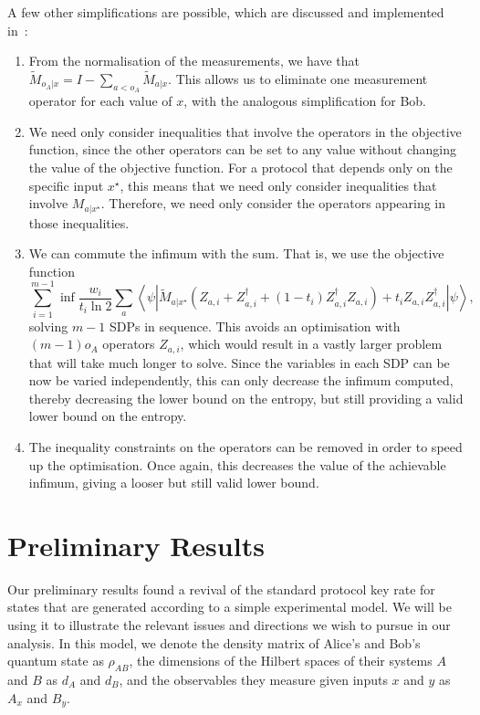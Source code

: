 \documentclass[10pt, a4paper]{article}
\numberwithin{equation}{section} %
\theoremstyle{definition}
\theoremstyle{plain}
\newcommand{\?}{\mathrel{?}} %
\newcommand{\angleb}[1]{\left\langle #1 \right\rangle} %
\begin{document}
      A few other simplifications are possible, which are discussed and implemented in~\cite{BFF_QRE}:
      \begin{enumerate}
        \item From the normalisation of the measurements, we have that \(\tilde{M}_{o_A|x} = I - \sum_{a < o_A} \tilde{M}_{a|x}\). This allows us to eliminate one measurement operator for each value of \(x\), with the analogous simplification for Bob.
        \item We need only consider inequalities that involve the operators in the objective function, since the other operators can be set to any value without changing the value of the objective function. For a protocol that depends only on the specific input \(x^{\star}\), this means that we need only consider inequalities that involve \(M_{a|x^{\star}}\). Therefore, we need only consider the operators appearing in those inequalities.
        \item We can commute the infimum with the sum. That is, we use the objective function
          \begin{equation} 
            \sum_{i=1}^{m-1} \inf \frac{w_i}{t_i \ln 2} \sum_a \angleb{\psi\left|
          \tilde{M}_{a|x^{\star}} \left( Z_{a,i} + Z_{a,i}^{\dagger} + (1-t_i)  Z_{a,i}^{\dagger}Z_{a,i}\right) + t_i Z_{a,i}Z_{a,i}^{\dagger} \right|\psi},
          \end{equation}
          solving \(m-1\) SDPs in sequence. This avoids an optimisation with \((m-1)o_A\) operators \(Z_{a,i}\), which would result in a vastly larger problem that will take much longer to solve. Since the variables in each SDP can be now be varied independently, this can only decrease the infimum computed, thereby decreasing the lower bound on the entropy, but still providing a valid lower bound on the entropy.
        \item The inequality constraints on the operators can be removed in order to speed up the optimisation. Once again, this decreases the value of the achievable infimum, giving a looser but still valid lower bound.
      \end{enumerate}

    \section{Preliminary Results}\label{sec:preres}

    Our preliminary results found a revival of the standard protocol key rate for states that are generated according to a simple experimental model. We will be using it to illustrate the relevant issues and directions we wish to pursue in our analysis. In this model, we denote the density matrix of Alice's and Bob's quantum state as \(\rho_{AB}\), the dimensions of the Hilbert spaces of their systems \(A\) and \(B\) as \(d_A\) and \(d_B\), and the observables they measure given inputs \(x\) and \(y\) as \(A_x\) and \(B_y\).
\end{document}
